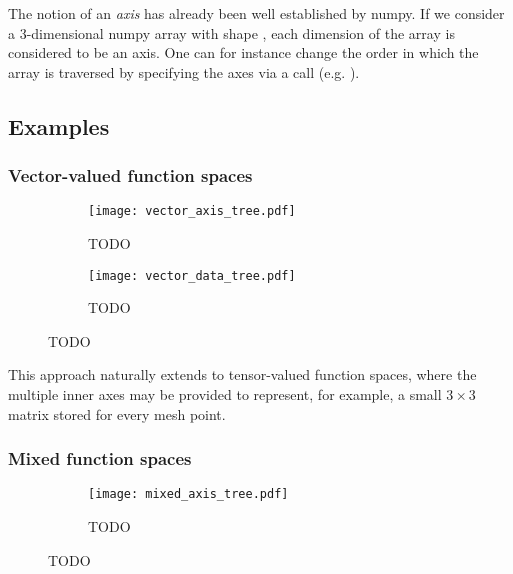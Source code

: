 \documentclass[thesis]{subfiles}
\begin{document}
The notion of an \textit{axis} has already been well established by numpy.
If we consider a 3-dimensional numpy array with shape , each dimension of the array is considered to be an axis.
One can for instance change the order in which the array is traversed by specifying the axes via a  call (e.g. ).

\subsection{Examples}

\subsubsection{Vector-valued function spaces}

\begin{figure}
  \centering
  \begin{subfigure}{\textwidth}
    \centering
    \texttt{[image: vector\_axis\_tree.pdf]}
    \caption{TODO}
    \label{fig:vector_axis_tree}
  \end{subfigure}
  \begin{subfigure}{\textwidth}
    \centering
    \texttt{[image: vector\_data\_tree.pdf]}
    \caption{TODO}
    \label{fig:vector_data_tree}
  \end{subfigure}
  \caption{TODO}
  \label{fig:vector_axis_data_tree}
\end{figure}


This approach naturally extends to tensor-valued function spaces, where the multiple inner axes may be provided to represent, for example, a small $3 \times 3$ matrix stored for every mesh point.

\subsubsection{Mixed function spaces}

\begin{figure}
  \centering
  \begin{subfigure}{\textwidth}
    \centering
    \texttt{[image: mixed\_axis\_tree.pdf]}
    \caption{TODO}
    \label{fig:mixed_axis_tree}
  \end{subfigure}

\end{figure}
\end{document}
